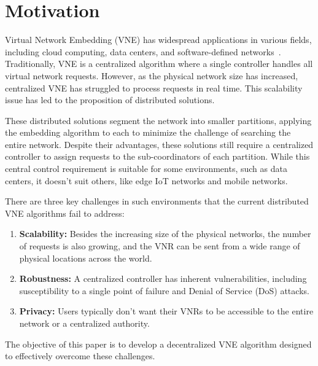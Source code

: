 \section{Motivation}
\label{sec:motivation}
Virtual Network Embedding (VNE) has widespread applications in various fields, including cloud computing, data centers, and software-defined networks~\cite{survey_1}.
%
Traditionally, VNE is a centralized algorithm where a single controller handles all virtual network requests. However, as the physical network size has increased, centralized VNE has struggled to process requests in real time. This scalability issue has led to the proposition of distributed solutions.


These distributed solutions segment the network into smaller partitions, applying the embedding algorithm to each to minimize the challenge of searching the entire network. Despite their advantages, these solutions still require a centralized controller to assign requests to the sub-coordinators of each partition. While this central control requirement is suitable for some environments, such as data centers, it doesn't suit others, like edge IoT networks and mobile networks.


There are three key challenges in such environments that the current distributed VNE algorithms fail to address:

\begin{enumerate}
\item \textbf{Scalability:} Besides the increasing size of the physical networks, the number of requests is also growing, and the VNR can be sent from a wide range of physical locations across the world.
\item \textbf{Robustness:} A centralized controller has inherent vulnerabilities, including susceptibility to a single point of failure and Denial of Service (DoS) attacks.
\item \textbf{Privacy:} Users typically don't want their VNRs to be accessible to the entire network or a centralized authority.
\end{enumerate}

The objective of this paper is to develop a decentralized VNE algorithm designed to effectively overcome these challenges.